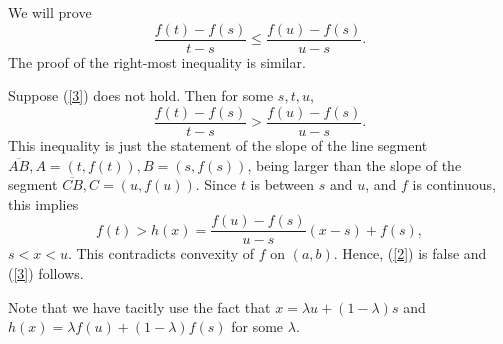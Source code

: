 \documentclass[12pt]{article}
\begin{document}
We will prove
\begin{equation}\label{3}
    \displaystyle
    \frac{f(t)-f(s)}{t-s}\leq\frac{f(u)-f(s)}{u-s}.
\end{equation}
The proof of the right-most inequality is similar.

Suppose (\ref{3}) does not hold. Then for some $s, t, u$,
\begin{equation}\label{2}
    \displaystyle
    \frac{f(t)-f(s)}{t-s}>\frac{f(u)-f(s)}{u-s}.
\end{equation}
This inequality is just the statement of the slope of the line
segment $\overline{AB}, A=(t, f(t)), B=(s, f(s))$, being larger than
the slope of the segment $\overline{CB}, C=(u, f(u))$. Since $t$ is
between $s$ and $u$, and $f$ is continuous, this implies
\begin{equation}
    f(t)>h(x)=\frac{f(u)-f(s)}{u-s}(x-s)+f(s),
\end{equation}
$s<x<u$. This contradicts convexity of $f$ on $(a, b)$. Hence,
(\ref{2}) is false and (\ref{3}) follows.

Note that we have tacitly use the fact that $x=\lambda u + (1-\lambda)s$ and $h(x)=\lambda
f(u)+(1-\lambda)f(s)$ for some $\lambda$. 
\end{document}
